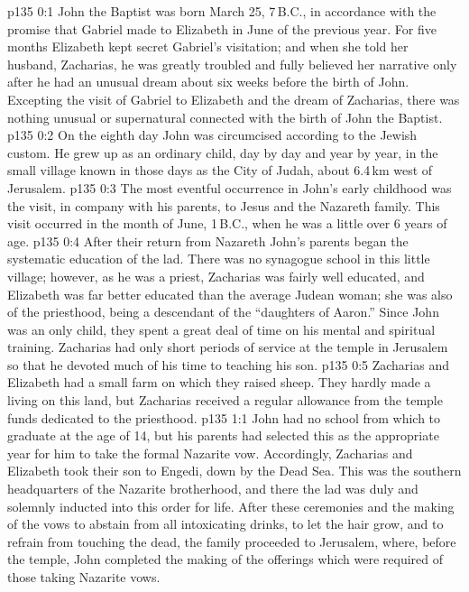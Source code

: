 \author{Midwayer Commission}
\vs p135 0:1 John the Baptist was born March 25, 7\,B.C., in accordance with the promise that Gabriel made to Elizabeth in June of the previous year. For five months Elizabeth kept secret Gabriel’s visitation; and when she told her husband, Zacharias, he was greatly troubled and fully believed her narrative only after he had an unusual dream about six weeks before the birth of John. Excepting the visit of Gabriel to Elizabeth and the dream of Zacharias, there was nothing unusual or supernatural connected with the birth of John the Baptist.
\vs p135 0:2 On the eighth day John was circumcised according to the Jewish custom. He grew up as an ordinary child, day by day and year by year, in the small village known in those days as the City of Judah, about 6.4\,km west of Jerusalem.
\vs p135 0:3 The most eventful occurrence in John’s early childhood was the visit, in company with his parents, to Jesus and the Nazareth family. This visit occurred in the month of June, 1\,B.C., when he was a little over 6 years of age.
\vs p135 0:4 After their return from Nazareth John’s parents began the systematic education of the lad. There was no synagogue school in this little village; however, as he was a priest, Zacharias was fairly well educated, and Elizabeth was far better educated than the average Judean woman; she was also of the priesthood, being a descendant of the “daughters of Aaron.” Since John was an only child, they spent a great deal of time on his mental and spiritual training. Zacharias had only short periods of service at the temple in Jerusalem so that he devoted much of his time to teaching his son.
\vs p135 0:5 Zacharias and Elizabeth had a small farm on which they raised sheep. They hardly made a living on this land, but Zacharias received a regular allowance from the temple funds dedicated to the priesthood.
\vs p135 1:1 John had no school from which to graduate at the age of 14, but his parents had selected this as the appropriate year for him to take the formal Nazarite vow. Accordingly, Zacharias and Elizabeth took their son to Engedi, down by the Dead Sea. This was the southern headquarters of the Nazarite brotherhood, and there the lad was duly and solemnly inducted into this order for life. After these ceremonies and the making of the vows to abstain from all intoxicating drinks, to let the hair grow, and to refrain from touching the dead, the family proceeded to Jerusalem, where, before the temple, John completed the making of the offerings which were required of those taking Nazarite vows.
